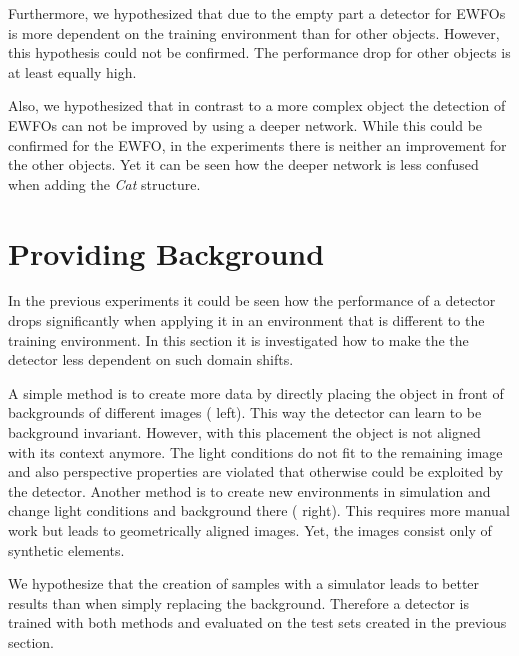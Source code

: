 Furthermore, we hypothesized that due to the empty part a detector for \acp{EWFO} is more dependent on the training environment than for other objects. However, this hypothesis could not be confirmed. The performance drop for other objects is at least equally high. 

Also, we hypothesized that in contrast to a more complex object the detection of \acp{EWFO} can not be improved by using a deeper network. While this could be confirmed for the \ac{EWFO}, in the experiments there is neither an improvement for the other objects. Yet it can be seen how the deeper network is less confused when adding the \textit{Cat} structure.

\section{Providing Background}
\label{sec:exp_background}
In the previous experiments it could be seen how the performance of a detector drops significantly when applying it in an environment that is different to the training environment. In this section it is investigated how to make the the detector less dependent on such domain shifts.

A simple method is to create more data by directly placing the object in front of backgrounds of different images ( left). This way the detector can learn to be background invariant. However, with this placement the object is not aligned with its context anymore. The light conditions do not fit to the remaining image and also perspective properties are violated that otherwise could be exploited by the detector. Another method is to create new environments in simulation and change light conditions and background there ( right). This requires more manual work but leads to geometrically aligned images. Yet, the images consist only of synthetic elements.

We hypothesize that the creation of samples with a simulator leads to better results than when simply replacing the background. Therefore a detector is trained with both methods and evaluated on the test sets created in the previous section.


